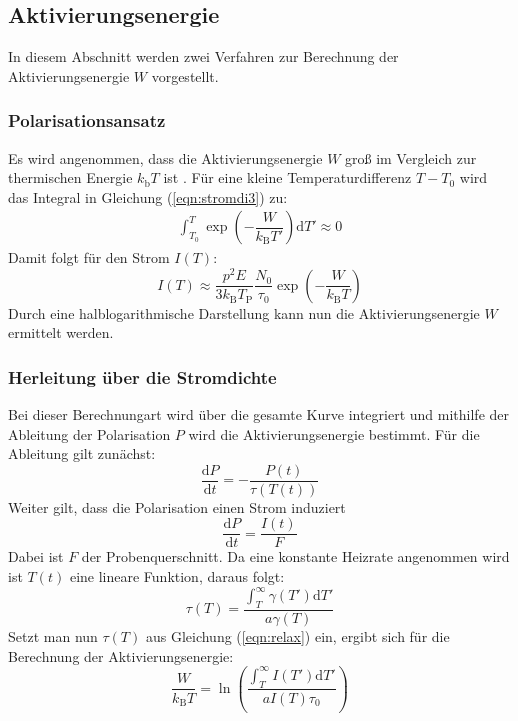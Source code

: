 \subsection{Aktivierungsenergie}
\label{sec:akti}
In diesem Abschnitt werden zwei Verfahren zur Berechnung der Aktivierungsenergie $W$ vorgestellt.
\subsubsection{Polarisationsansatz}
\label{sec:polaris}
Es wird angenommen, dass die Aktivierungsenergie $W$ groß im Vergleich zur thermischen Energie $k_\mathrm{b} T$ ist \cite[585,586]{Anleitung9}. Für eine kleine Temperaturdifferenz $T-T_\mathrm{0}$ wird das Integral in Gleichung (\ref{eqn:stromdi3}) zu:
\begin{align*}
  \int_{T_0}^T\exp{\left(-\dfrac{W}{k_\mathrm{B}T'}\right)\mathrm{d}T'}\approx0
\end{align*}
Damit folgt für den Strom $I(T)$:
\begin{equation}
  \label{eqn:polarime}
  I(T)\approx \dfrac{p^2 E}{3k_\mathrm{B}T_\mathrm{P}}\dfrac{N_\mathrm{0}}{\tau_\mathrm{0}}\exp\left(-\dfrac{W}{k_\mathrm{B}T}\right)
\end{equation}
Durch eine halblogarithmische Darstellung kann nun die Aktivierungsenergie $W$ ermittelt werden.
\subsubsection{Herleitung über die Stromdichte}
\label{sec:strom1}
Bei dieser Berechnungart wird über die gesamte Kurve integriert und mithilfe der Ableitung der Polarisation $P$ wird die Aktivierungsenergie bestimmt. Für die Ableitung gilt zunächst:
\begin{equation*}
  \dfrac{\mathrm{d}P}{\mathrm{d}t}=-\dfrac{P(t)}{\tau(T(t))}
\end{equation*}
Weiter gilt, dass die Polarisation einen Strom induziert
\begin{equation*}
  \dfrac{\mathrm{d}P}{\mathrm{d}t}=\dfrac{I(t)}{F}
\end{equation*}
Dabei ist $F$ der Probenquerschnitt. Da eine konstante Heizrate angenommen wird ist $T(t)$ eine lineare Funktion, daraus folgt:
\begin{equation*}
  \tau(T) = \frac{\int_{T}^\infty \gamma(T') \mathrm{d}T' }{ a \gamma(T) }
\end{equation*}
Setzt man nun $\tau(T)$ aus Gleichung (\ref{eqn:relax}) ein, ergibt sich für die Berechnung der Aktivierungsenergie:
\begin{equation}
  \label{eqn:integrate}
  \dfrac{ W }{ k_\mathrm{B} T } = \ln{ \left( \frac{ \int_{T}^\infty I(T') \mathrm{d}T' }{ a I(T) \tau_\mathrm{0} } \right) }
\end{equation}
